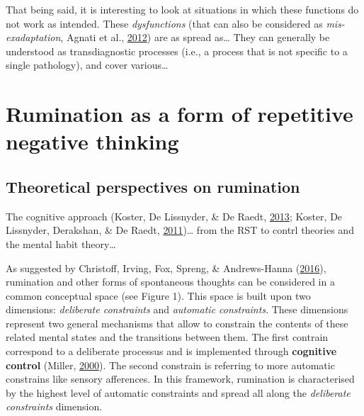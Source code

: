 \documentclass[a4paper,12pt,twoside,openright,oldfontcommands]{memoir}
\begin{document}
That being said, it is interesting to look at situations in which these
functions do not work as intended. These \emph{dysfunctions} (that can
also be considered as \emph{mis-exadaptation}, Agnati et al.,
\protect\hyperlink{ref-agnati_possible_2012}{2012}) are as spread
as\ldots{} They can generally be understood as transdiagnostic processes
(i.e., a process that is not specific to a single pathology), and cover
various\ldots{}

\section{Rumination as a form of repetitive negative
thinking}\label{rumination-as-a-form-of-repetitive-negative-thinking}

\subsection{Theoretical perspectives on
rumination}\label{theoretical-perspectives-on-rumination}

The cognitive approach (Koster, De Lissnyder, \& De Raedt,
\protect\hyperlink{ref-Koster2013}{2013}; Koster, De Lissnyder,
Derakshan, \& De Raedt,
\protect\hyperlink{ref-Koster2011}{2011})\ldots{} from the RST to contrl
theories and the mental habit theory\ldots{}

As suggested by Christoff, Irving, Fox, Spreng, \& Andrews-Hanna
(\protect\hyperlink{ref-christoff_mind-wandering_2016}{2016}),
rumination and other forms of spontaneous thoughts can be considered in
a common conceptual space (see Figure 1). This space is built upon two
dimensions: \emph{deliberate constraints} and \emph{automatic
constraints}. These dimensions represent two general mechanisms that
allow to constrain the contents of these related mental states and the
transitions between them. The first contrain correspond to a deliberate
processus and is implemented through \textbf{cognitive control} (Miller,
\protect\hyperlink{ref-miller_prefontral_2000}{2000}). The second
constrain is referring to more automatic constrains like sensory
afferences. In this framework, rumination is characterised by the
highest level of automatic constraints and spread all along the
\emph{deliberate constraints} dimension.
\end{document}
